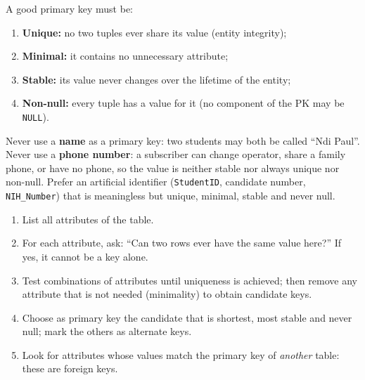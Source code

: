 \documentclass[11pt]{article}
\begin{document}
\begin{propriete}
A good primary key must be:
\begin{enumerate}
\item \textbf{Unique:} no two tuples ever share its value (entity integrity);
\item \textbf{Minimal:} it contains no unnecessary attribute;
\item \textbf{Stable:} its value never changes over the lifetime of the entity;
\item \textbf{Non-null:} every tuple has a value for it (no component of the PK may be \texttt{NULL}).
\end{enumerate}
\end{propriete}

\begin{attention}
Never use a \textbf{name} as a primary key: two students may both be called ``Ndi Paul''. Never use a \textbf{phone number}: a subscriber can change operator, share a family phone, or have no phone, so the value is neither stable nor always unique nor non-null. Prefer an artificial identifier (\texttt{StudentID}, candidate number, \texttt{NIH\_Number}) that is meaningless but unique, minimal, stable and never null.
\end{attention}

\begin{methode}
\begin{enumerate}
\item List all attributes of the table.
\item For each attribute, ask: ``Can two rows ever have the same value here?'' If yes, it cannot be a key alone.
\item Test combinations of attributes until uniqueness is achieved; then remove any attribute that is not needed (minimality) to obtain candidate keys.
\item Choose as primary key the candidate that is shortest, most stable and never null; mark the others as alternate keys.
\item Look for attributes whose values match the primary key of \emph{another} table: these are foreign keys.
\end{enumerate}
\end{methode}
\end{document}
